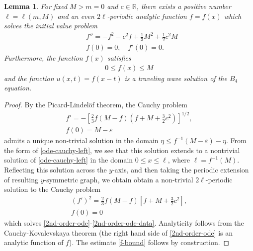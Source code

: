 \documentclass[12pt,reqno]{amsart}
\numberwithin{equation}{section}  %
\newcommand{\rr}{\mathbb{R}}
\newcommand{\ee}{\varepsilon}
\newtheorem{lemma}[theorem]{Lemma}
\begin{document}
%
%
%
%
%
%                
%
%
%
%
\begin{lemma}
  For fixed $M > m = 0$ and $c \in \rr$,  there exists a positive
  number $\ell = \ell(m, M)$ and an even $2\ell$-periodic analytic function $f =
  f(x)$ which solves the initial value problem
\begin{align}
  \label{2nd-order-ode}
  & f'' = -f^{2} - c^{2} f + \frac{1}{3} M^{2} + \frac{1}{2}c^{2} M
\\
\label{2nd-order-ode-data}
& f(0)=0, \quad f'(0) = 0.
\end{align}
Furthermore, the function
  $f(x)$ satisfies
  \begin{equation}
    \label{f-bound}
  \begin{split}
  0 \le f(x) \le M
  \end{split}
  \end{equation}
  and the function $u(x,t) = f(x-t)$ is a traveling wave solution of the
  $B_{4}$ equation. 
\label{lem:ode-solution}
\end{lemma}
%
%
%
\begin{proof}
By the Picard-Lindel\"of theorem, the Cauchy problem
\begin{gather}
  \label{ode-cauchy-left}
   f'
  = -\left [ \frac{2}{3} f
  \left( M -f \right )
  \left ( f +M + \frac{3}{2}c^{2}\right ) \right
  ]^{1/2},
  \\
\label{ode-cauchy-data-left}
f(0) = M-\ee
\end{gather}
admits a unique non-trivial solution in the domain $\eta \le f^{-1}(M- \ee) - \eta$.
From the form of \eqref{ode-cauchy-left}, we see that this solution extends to a
nontrivial solution of \eqref{ode-cauchy-left} in the domain $0 \le x \le \ell$,
where $\ell = f^{-1}(M)$. Reflecting this solution across the $y$-axis, and then
taking the periodic extension of resulting $y$-symmetric graph, we obtain 
obtain a non-trivial $2\ell$-periodic
solution to the Cauchy problem
\begin{gather}
  (f')^{2}
  = \frac{2}{3} f
  \left( M -f \right )
  \left [ f +M + \frac{3}{2}c^{2}  \right ],
  \\
   f(0) =0
\end{gather}
which solves 
\eqref{2nd-order-ode}-\eqref{2nd-order-ode-data}. Analyticity follows from the
Cauchy-Kovalevskaya theorem (the right hand side of \eqref{2nd-order-ode} is an
analytic function of $f$). The
estimate \eqref{f-bound} follows by construction.
%
%
\end{proof}
\end{document}
